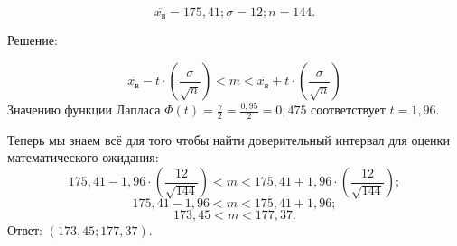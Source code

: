 \documentclass{article}
\begin{document}
\begin{enumerate}
$$\overline{x_\textit{в}}=175,41; \sigma=12; n=144.$$
\begin{center}Решение:\end{center}
$$\overline{x_\textit{в}}-t\cdot\left(\frac{\sigma}{\sqrt{n}}\right)<m<\overline{x_\textit{в}}+t\cdot\left(\frac{\sigma}{\sqrt{n}}\right)$$
Значению функции Лапласа $\Phi(t)=\frac{\gamma}{2}=\frac{0,95}{2}=0,475$ соответствует $t=1,96$.

Теперь мы знаем всё для того чтобы найти доверительный интервал для оценки математического ожидания:
$$175,41-1,96\cdot\left(\frac{12}{\sqrt{144}}\right)<m<175,41+1,96\cdot\left(\frac{12}{\sqrt{144}}\right);$$
$$175,41-1,96<m<175,41+1,96;$$
$$173,45<m<177,37.$$
Ответ: $(173,45;177,37)$.

\end{enumerate}
\end{document}
